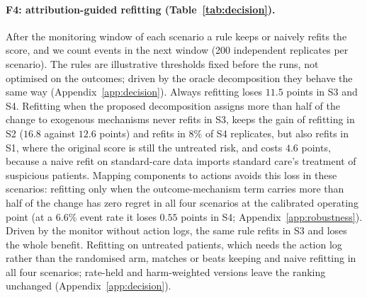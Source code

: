 \documentclass[letterpaper]{article} %
\begin{document}
\paragraph{F4: attribution-guided refitting (Table~\ref{tab:decision}).}
After the monitoring window of each scenario a rule keeps or naively refits
the score, and we count events in the next window (200 independent replicates
per scenario). The rules are illustrative thresholds fixed before the runs,
not optimised on the outcomes; driven by the oracle decomposition they behave
the same way (Appendix~\ref{app:decision}). Always refitting loses $11.5$ points in S3 and S4. Refitting
when the proposed decomposition assigns more than half of the change to
exogenous mechanisms never refits in S3, keeps the gain of refitting in S2
($16.8$ against $12.6$ points) and refits in $8\%$ of S4 replicates, but also
refits in S1, where the original
score is still the untreated risk, and costs $4.6$ points, because a naive
refit on standard-care data imports standard care's treatment of suspicious
patients. Mapping components to actions avoids this loss in these scenarios:
refitting only when
the outcome-mechanism term carries more than half of the change has zero
regret in all four scenarios at the calibrated operating point (at a $6.6\%$
event rate it loses $0.55$ points in S4; Appendix~\ref{app:robustness}).
Driven by the monitor without action logs, the same rule refits in S3 and
loses the whole benefit. Refitting on untreated patients, which needs the
action log rather than the randomised arm, matches or beats keeping and
naive refitting in all four scenarios; rate-held and harm-weighted versions
leave the ranking unchanged (Appendix~\ref{app:decision}).
\end{document}
